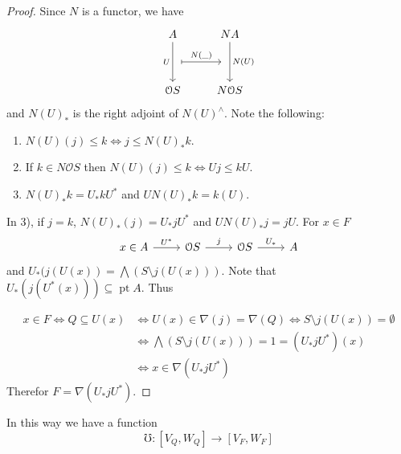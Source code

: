 \documentclass[11pt]{amsart}
\DeclareMathOperator{\pt}{pt}
\theoremstyle{plain}
\newtheorem{prop}[thm]{Proposition}
\theoremstyle{definition}
\begin{document}
\begin{proof}
Since $N$ is a functor, we have 
\[\begin{tikzcd}
	A & NA \\
	\\
	{\mathcal{O}S} & {N\mathcal{O}S}
	\arrow[""{name=0, anchor=center, inner sep=0}, "U"', from=1-1, to=3-1]
	\arrow[""{name=1, anchor=center, inner sep=0}, "{N(U)}", from=1-2, to=3-2]
	\arrow["{N(\_)}", shorten <=7pt, shorten >=7pt, maps to, from=0, to=1]
\end{tikzcd}\]
and $N(U)_*$ is the right adjoint of $N(U)^\wedge$. Note the following:
\begin{enumerate}
	\item $N(U)(j)\leq k\Leftrightarrow j\leq N(U)_*k$.
	\item If $k\in N\mathcal{O}S$ then $N(U)(j)\leq k\Leftrightarrow Uj\leq kU$.
	\item $N(U)_*k=U_*kU^*$ and $UN(U)_*k=k(U)$.
\end{enumerate}
In 3), if $j=k$, $N(U)_*(j)=U_*jU^*$ and $UN(U)_*j=jU$. For $x\in F$
\[\begin{tikzcd}
	x\in A & {\mathcal{O}S} & {\mathcal{O}S} & A
	\arrow["{U^*}", from=1-1, to=1-2]
	\arrow["j", from=1-2, to=1-3]
	\arrow["{U_*}", from=1-3, to=1-4]
\end{tikzcd}\]
and $U_*(j(U(x))=\bigwedge(S\setminus j(U(x)))$. Note that $U_*(j(U^*(x)))\subseteq \pt A$. Thus

\[
\begin{split}
x\in F \Leftrightarrow Q\subseteq U(x) &\Leftrightarrow U(x)\in \nabla(j)=\nabla(Q)\Leftrightarrow S\setminus j(U(x))=\emptyset\\
& \Leftrightarrow \bigwedge (S\setminus j(U(x)))=1=(U_*jU^*)(x)\\
&\Leftrightarrow x\in \nabla(U_*jU^*)
\end{split}
\]
Therefor $F=\nabla(U_*jU^*)$.
\end{proof}
In this way we have a function 
\[
\mho\colon [V_Q, W_Q]\to [V_F, W_F]
\]




\end{document}
